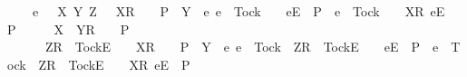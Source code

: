 \ \ \ \ {\isacharparenleft}{\isasymAnd}e\ {\isasymrho}\ {\isasymsigma}\ X\ Y\ Z{\isachardot}\ {\isacharparenleft}{\isacharparenleft}{\isasymrho}\ {\isacharat}\ {\isacharbrackleft}{\isacharbrackleft}X{\isacharbrackright}\isactrlsub R{\isacharbrackright}\ {\isacharat}\ {\isasymsigma}\ {\isasymin}\ P\ {\isasymand}\ {\isacharparenleft}Y\ {\isasyminter}\ {\isacharbraceleft}e{\isachardot}\ {\isacharparenleft}e\ {\isasymnoteq}\ Tock\ {\isasymand}\ {\isasymrho}\ {\isacharat}\ {\isacharbrackleft}{\isacharbrackleft}e{\isacharbrackright}\isactrlsub E{\isacharbrackright}\ {\isasymin}\ P{\isacharparenright}\ {\isasymor}\ {\isacharparenleft}e\ {\isacharequal}\ Tock\ {\isasymand}\ {\isasymrho}\ {\isacharat}\ {\isacharbrackleft}{\isacharbrackleft}X{\isacharbrackright}\isactrlsub R{\isacharcomma}\ {\isacharbrackleft}e{\isacharbrackright}\isactrlsub E{\isacharbrackright}\ {\isasymin}\ P{\isacharparenright}{\isacharbraceright}\ {\isacharequal}\ {\isacharbraceleft}{\isacharbraceright}{\isacharparenright}{\isacharparenright}\ {\isasymLongrightarrow}\ {\isasymrho}\ {\isacharat}\ {\isacharbrackleft}{\isacharbrackleft}X\ {\isasymunion}\ Y{\isacharbrackright}\isactrlsub R{\isacharbrackright}\ {\isacharat}\ {\isasymsigma}\ {\isasymin}\ P{\isacharparenright}\ {\isasymLongrightarrow}\ \isanewline
\ \ \ \ \ \ {\isacharparenleft}{\isacharparenleft}{\isacharbrackleft}Z{\isacharbrackright}\isactrlsub R\ {\isacharhash}\ {\isacharbrackleft}Tock{\isacharbrackright}\isactrlsub E\ {\isacharhash}\ {\isasymrho}\ {\isacharat}\ {\isacharbrackleft}{\isacharbrackleft}X{\isacharbrackright}\isactrlsub R{\isacharbrackright}\ {\isacharat}\ {\isasymsigma}\ {\isasymin}\ P\ {\isasymand}\ {\isacharparenleft}Y\ {\isasyminter}\ {\isacharbraceleft}e{\isachardot}\ {\isacharparenleft}e\ {\isasymnoteq}\ Tock\ {\isasymand}\ {\isacharbrackleft}Z{\isacharbrackright}\isactrlsub R\ {\isacharhash}\ {\isacharbrackleft}Tock{\isacharbrackright}\isactrlsub E\ {\isacharhash}\ {\isasymrho}\ {\isacharat}\ {\isacharbrackleft}{\isacharbrackleft}e{\isacharbrackright}\isactrlsub E{\isacharbrackright}\ {\isasymin}\ P{\isacharparenright}\ {\isasymor}\ {\isacharparenleft}e\ {\isacharequal}\ Tock\ {\isasymand}\ {\isacharbrackleft}Z{\isacharbrackright}\isactrlsub R\ {\isacharhash}\ {\isacharbrackleft}Tock{\isacharbrackright}\isactrlsub E\ {\isacharhash}\ {\isasymrho}\ {\isacharat}\ {\isacharbrackleft}{\isacharbrackleft}X{\isacharbrackright}\isactrlsub R{\isacharcomma}\ {\isacharbrackleft}e{\isacharbrackright}\isactrlsub E{\isacharbrackright}\ {\isasymin}\ P{\isacharparenright}{\isacharbraceright}\ {\isacharequal}\ {\isacharbraceleft}{\isacharbraceright}{\isacharparenright}{\isacharparenright}\ {\isasymLongrightarrow}\isanewline
